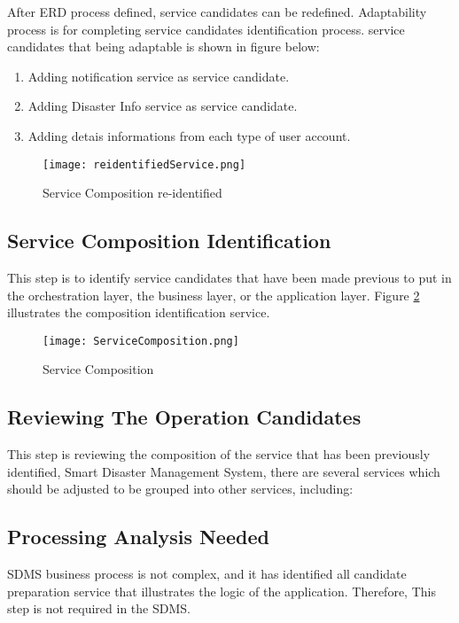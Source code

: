 After ERD process defined, service candidates can be redefined. Adaptability process is for completing service candidates identification process. service candidates that being adaptable is shown in figure below:

\begin{enumerate}
\setlength{\itemsep}{1.5pt}
\setlength{\parskip}{1.5pt}
\item Adding notification service as service candidate. 
\item Adding Disaster Info service as service candidate.
\item Adding detais informations from each type of user account.
\end{enumerate}

\begin{figure}[H]
\centering
\texttt{[image: reidentifiedService.png]}
\label{fig:ReServiceComposition}
\caption{Service Composition re-identified}
\end{figure}

\subsection{Service Composition Identification}
This step is to identify service candidates that have been made
previous to put in the orchestration layer, the business layer, or
the application layer. Figure \ref{fig:ServiceComposition} illustrates the composition identification service.

\begin{figure}[H]
\centering
\texttt{[image: ServiceComposition.png]}
\label{fig:ServiceComposition}
\caption{Service Composition}
\end{figure}

\subsection{Reviewing The Operation Candidates}
This step is reviewing the composition of the service that has been previously identified, Smart Disaster Management System, there are several services
which should be adjusted to be grouped into other services, including:

\subsection{Processing Analysis Needed}
SDMS business process is not complex, and it has identified all
candidate preparation service that illustrates the logic of the application. Therefore,
This step is not required in the SDMS.

